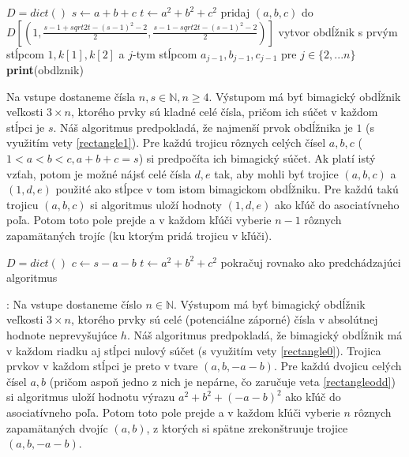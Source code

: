 \begin{algorithmic}
\STATE $D = dict()$
			\STATE $s \gets a+b+c$
			\STATE $t \gets a^2+b^2+c^2$
				\STATE pridaj $(a,b,c)$ do $D[(1, \frac{s-1 + sqrt{2t - (s-1)^2 - 2}}{2}, \frac{s-1 - sqrt{2t - (s-1)^2 - 2}}{2})]$
			\ENDIF
		\ENDFOR
	\ENDFOR
\ENDFOR
{}
				\STATE vytvor obdĺžnik s prvým stĺpcom $1, k[1], k[2]$ a $j$-tym stĺpcom $a_{j-1}, b_{j-1}, c_{j-1}$ pre $j \in \{2, ... n\}$
					\STATE \textbf{print}(obdlznik)
				\ENDIF
			\ENDFOR
		\ENDIF
	\ENDFOR
\ENDFOR
\end{algorithmic}

\begin{subalg} Na vstupe dostaneme čísla $n,s \in \mathbb{N}, n \geq 4$. Výstupom má byť bimagický obdĺžnik veľkosti $3 \times n$, ktorého prvky sú kladné celé čísla, pričom ich súčet v každom stĺpci je $s$. Náš algoritmus predpokladá, že najmenší prvok obdĺžnika je $1$ (s využitím vety \ref{rectangle1}). Pre každú trojicu rôznych celých čísel $a,b,c$ ($1 < a < b < c, a+b+c = s$) si predpočíta ich bimagický súčet. Ak platí istý vzťah, potom je možné nájsť celé čísla $d,e$ tak, aby mohli byť trojice $(a,b,c)$ a $(1,d,e)$ použité ako stĺpce v tom istom bimagickom obdĺžniku. Pre každú takú trojicu $(a,b,c)$ si algoritmus uloží hodnoty $(1,d,e)$ ako kľúč do asociatívneho poľa. Potom toto pole prejde a v každom kľúči vyberie $n-1$ rôznych zapamätaných trojíc (ku ktorým pridá trojicu v kľúči).
\end{subalg}

\begin{algorithmic}
\STATE $D = dict()$
		\STATE $c \gets s-a-b$
		\STATE $t \gets a^2+b^2+c^2$
		\STATE pokračuj rovnako ako predchádzajúci algoritmus
	\ENDFOR
\ENDFOR
\end{algorithmic}

\begin{subalg}: Na vstupe dostaneme číslo $n \in \mathbb{N}$. Výstupom má byť bimagický obdĺžnik veľkosti $3 \times n$, ktorého prvky sú celé (potenciálne záporné) čísla v absolútnej hodnote neprevyšujúce $h$. Náš algoritmus predpokladá, že bimagický obdĺžnik má v každom riadku aj stĺpci nulový súčet (s využitím vety \ref{rectangle0}). Trojica prvkov v každom stĺpci je preto v tvare $(a, b, -a-b)$. Pre každú dvojicu celých čísel $a,b$ (pričom aspoň jedno z nich je nepárne, čo zaručuje veta \ref{rectangleodd}) si algoritmus uloží hodnotu výrazu $a^2 + b^2 + (-a-b)^2$ ako kľúč do asociatívneho poľa. Potom toto pole prejde a v každom kľúči vyberie $n$ rôznych zapamätaných dvojíc $(a,b)$, z ktorých si spätne zrekonštruuje trojice $(a,b,-a-b)$.
\end{subalg}

